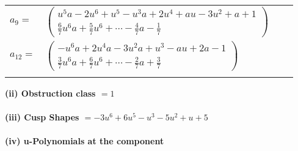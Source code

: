 \documentclass[1p]{elsarticle_modified}
\theoremstyle{definition}
\begin{document}
\begin{tabular}{m{7pt} m{180pt} m{7pt} m{180pt} }
\flushright $a_{9}=$&$\begin{pmatrix}u^5 a-2 u^6+u^5- u^3 a+2 u^4+a u-3 u^2+a+1\\\frac{6}{7} u^6 a+\frac{5}{7} u^6+\cdots-\frac{4}{7} a-\frac{1}{7}\end{pmatrix}$ \\
\flushright $a_{12}=$&$\begin{pmatrix}- u^6 a+2 u^4 a-3 u^2 a+u^3- a u+2 a-1\\\frac{3}{7} u^6 a+\frac{6}{7} u^6+\cdots-\frac{2}{7} a+\frac{3}{7}\end{pmatrix}$\\&\end{tabular}
\flushleft \textbf{(ii) Obstruction class $= 1$}\\~\\
\flushleft \textbf{(iii) Cusp Shapes $= -3 u^6+6 u^5- u^3-5 u^2+u+5$}\\~\\
\newpage\renewcommand{\arraystretch}{1}
\flushleft \textbf{(iv) u-Polynomials at the component}\newline \\
\end{document}

